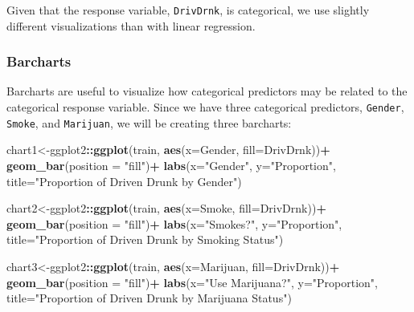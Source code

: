 \documentclass[
]{book}
\newenvironment{Shaded}{\begin{snugshade}}{\end{snugshade}}
\newcommand{\AttributeTok}[1]{\textcolor[rgb]{0.13,0.29,0.53}{#1}}
\newcommand{\FunctionTok}[1]{\textcolor[rgb]{0.13,0.29,0.53}{\textbf{#1}}}
\newcommand{\NormalTok}[1]{#1}
\newcommand{\OtherTok}[1]{\textcolor[rgb]{0.56,0.35,0.01}{#1}}
\newcommand{\SpecialCharTok}[1]{\textcolor[rgb]{0.81,0.36,0.00}{\textbf{#1}}}
\newcommand{\StringTok}[1]{\textcolor[rgb]{0.31,0.60,0.02}{#1}}
\begin{document}
Given that the response variable, \texttt{DrivDrnk}, is categorical, we use slightly different visualizations than with linear regression.

\hypertarget{barcharts}{%
\subsubsection*{Barcharts}\label{barcharts}}

Barcharts are useful to visualize how categorical predictors may be related to the categorical response variable. Since we have three categorical predictors, \texttt{Gender}, \texttt{Smoke}, and \texttt{Marijuan}, we will be creating three barcharts:

\begin{Shaded}
\begin{Highlighting}[]
\NormalTok{chart1}\OtherTok{\textless{}{-}}\NormalTok{ggplot2}\SpecialCharTok{::}\FunctionTok{ggplot}\NormalTok{(train, }\FunctionTok{aes}\NormalTok{(}\AttributeTok{x=}\NormalTok{Gender, }\AttributeTok{fill=}\NormalTok{DrivDrnk))}\SpecialCharTok{+}
  \FunctionTok{geom\_bar}\NormalTok{(}\AttributeTok{position =} \StringTok{"fill"}\NormalTok{)}\SpecialCharTok{+}
  \FunctionTok{labs}\NormalTok{(}\AttributeTok{x=}\StringTok{"Gender"}\NormalTok{, }\AttributeTok{y=}\StringTok{"Proportion"}\NormalTok{,}
       \AttributeTok{title=}\StringTok{"Proportion of Driven Drunk by Gender"}\NormalTok{)}

\NormalTok{chart2}\OtherTok{\textless{}{-}}\NormalTok{ggplot2}\SpecialCharTok{::}\FunctionTok{ggplot}\NormalTok{(train, }\FunctionTok{aes}\NormalTok{(}\AttributeTok{x=}\NormalTok{Smoke, }\AttributeTok{fill=}\NormalTok{DrivDrnk))}\SpecialCharTok{+}
  \FunctionTok{geom\_bar}\NormalTok{(}\AttributeTok{position =} \StringTok{"fill"}\NormalTok{)}\SpecialCharTok{+}
  \FunctionTok{labs}\NormalTok{(}\AttributeTok{x=}\StringTok{"Smokes?"}\NormalTok{, }\AttributeTok{y=}\StringTok{"Proportion"}\NormalTok{,}
       \AttributeTok{title=}\StringTok{"Proportion of Driven Drunk by Smoking Status"}\NormalTok{)}

\NormalTok{chart3}\OtherTok{\textless{}{-}}\NormalTok{ggplot2}\SpecialCharTok{::}\FunctionTok{ggplot}\NormalTok{(train, }\FunctionTok{aes}\NormalTok{(}\AttributeTok{x=}\NormalTok{Marijuan, }\AttributeTok{fill=}\NormalTok{DrivDrnk))}\SpecialCharTok{+}
  \FunctionTok{geom\_bar}\NormalTok{(}\AttributeTok{position =} \StringTok{"fill"}\NormalTok{)}\SpecialCharTok{+}
  \FunctionTok{labs}\NormalTok{(}\AttributeTok{x=}\StringTok{"Use Marijuana?"}\NormalTok{, }\AttributeTok{y=}\StringTok{"Proportion"}\NormalTok{,}
       \AttributeTok{title=}\StringTok{"Proportion of Driven Drunk by Marijuana Status"}\NormalTok{)}
\end{Highlighting}
\end{Shaded}
\end{document}
